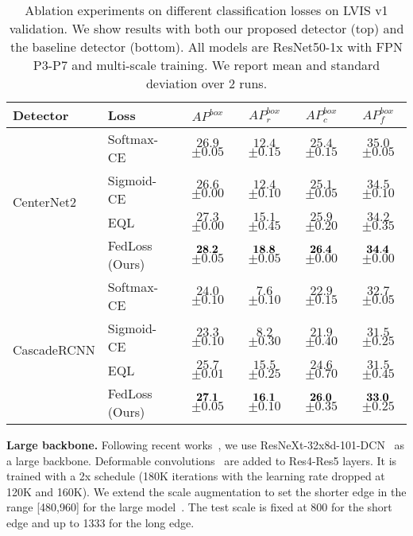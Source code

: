 \documentclass{article}
\renewcommand{\paragraph}[1]{\noindent\textbf{#1}}
\begin{document}
\begin{table*}[!t]
\centering
\begin{tabular}{@{}l@{\ \ \ }l@{\ \ }c@{\ \ \ \ }c@{\ \ \ \ }c@{\ \ \ \ }c@{}}
\toprule
Detector & Loss & $AP^{box}$ & $AP^{box}_{r}$ & $AP^{box}_{c}$ & $AP^{box}_{f}$ \\
\midrule
\multirow{4}{7em}{CenterNet2}
& Softmax-CE & $26.9$ \scriptsize $ \pm 0.05$ & $12.4$ \scriptsize $ \pm 0.15$ & $25.4$ \scriptsize $ \pm 0.15$ & $35.0$ \scriptsize $ \pm 0.05$  \\
& Sigmoid-CE & $26.6$ \scriptsize $ \pm 0.00$ & $12.4$ \scriptsize $ \pm 0.10$ & $25.1$ \scriptsize $ \pm 0.05$ & $34.5$ \scriptsize $ \pm 0.10$ \\
& EQL~\cite{tan2020eql} & $27.3$ \scriptsize $ \pm 0.00$ & $15.1$ \scriptsize $ \pm 0.45$ & $25.9$ \scriptsize $ \pm 0.20$ & $34.2$ \scriptsize $ \pm 0.35$ \\
& FedLoss (Ours) & $\bf 28.2$ \scriptsize $ \pm 0.05$ & $\bf 18.8$ \scriptsize $ \pm 0.05$ & $\bf 26.4$ \scriptsize $ \pm 0.00$ & $\bf 34.4$ \scriptsize $ \pm 0.00$\\
\midrule
\multirow{4}{7em}{CascadeRCNN}
& Softmax-CE  & $24.0$ \scriptsize $ \pm 0.10$ & $7.6$ \scriptsize $ \pm 0.10$ & $22.9$ \scriptsize $ \pm 0.15$ & $32.7$ \scriptsize $ \pm 0.05$  \\
& Sigmoid-CE & $23.3$ \scriptsize $ \pm 0.10 $ & $8.2$ \scriptsize $ \pm 0.30$ & $21.9$ \scriptsize $ \pm 0.40$ & $31.5$ \scriptsize $ \pm 0.25$ \\
& EQL~\cite{tan2020eql} & $25.7$ \scriptsize $ \pm 0.01$ & $15.5$ \scriptsize $ \pm 0.25$ & $24.6$ \scriptsize $ \pm 0.70$ & $31.5$ \scriptsize $ \pm 0.45$ \\
& FedLoss (Ours) & $\bf 27.1$ \scriptsize $ \pm 0.05$ & $\bf 16.1$ \scriptsize $ \pm 0.10$ & $\bf 26.0$ \scriptsize $ \pm 0.35$ & $\bf 33.0$ \scriptsize $ \pm 0.25$ \\
\bottomrule
\end{tabular}
\normalsize
\caption{Ablation experiments on different classification losses on LVIS v1 validation. We show results with both our proposed detector (top) and the baseline detector (bottom). All models are ResNet50-1x with FPN P3-P7 and multi-scale training. We report mean and standard deviation over 2 runs.}
\label{table:fedloss}
\vspace{-3mm}
\end{table*}

\paragraph{Large backbone.}
Following recent works~\cite{tian2019fcos,zhu2020autoassign,zhang2020bridging},
we use ResNeXt-32x8d-101-DCN~\cite{xie2017aggregated} as a large backbone.
Deformable convolutions~\cite{zhu2019deformable} are added to Res4-Res5 layers.
It is trained with a 2x schedule (180K iterations with the learning rate dropped at 120K and 160K). 
We extend the scale augmentation to set the shorter edge in the range [480,960] for the large model~\cite{zhang2019freeanchor,zhu2020autoassign,chen2020reppointsv2}.
The test scale is fixed at 800 for the short edge and up to 1333 for the long edge.
\end{document}
